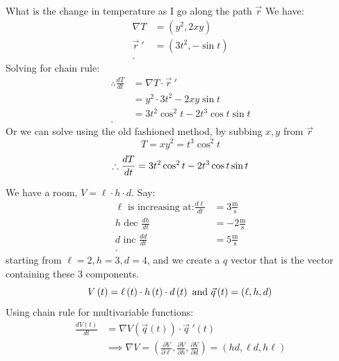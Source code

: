 \begin{itemize}
\begin{example}
\begin{equation}
		\end{equation}
		What is the change in temperature as I go along the path $\vec{r}$ We have:
		\begin{align*}
			\nabla T &= \left( y^2 , 2xy\right) \\
			\vec{r}~' &= \left( 3t^2, -\sin t \right)  \\
		.\end{align*}
		Solving for chain rule:
		\begin{align*}
			\therefore \frac{dT}{dt}&= \nabla T \cdot  \vec{r}~' \\
			&= y^2\cdot 3t^2-2xy\sin t \\
			&= 3t^2\cos^2 t - 2t^3\cos t \sin t \\
		.\end{align*}
		Or we can solve using the old fashioned method, by subbing $x,y$ from $\vec{r}$
		\begin{equation}
			T = xy^2 = t^3 \cos^2 t
		\end{equation}
		\begin{equation}
			\therefore \frac{dT}{dt} = 3t^2\cos^2t - 2t^3\cos t \sin t \\
		\end{equation}
	\end{example}
	\begin{example}
		We have a room, $V = \ell\cdot h\cdot d $. Say:
		\begin{align*}
			\ell \text{ is increasing at:} \frac{d\ell}{dt} &=  3 \frac{\text{m}}{\text{s}} \\
			h \text{ dec } \frac{dh}{dt}&= -2 \frac{\text{m}}{\text{s}} \\
			d \text{ inc } \frac{dd}{dt} &= 5 \frac{\text{m}}{\text{s}} \\
		.\end{align*}
		starting from $ \ell = 2, h = 3, d = 4$, and we create a $q$ vector that is the vector containing these 3 components.
		\begin{equation}
			V\left( t \right) = \ell\left( t \right)  \cdot  h\left( t  \right) \cdot d\left( t \right) \text{ and } \vec{q}\left( t \right) = \left( \ell, h, d \right)  \\
		\end{equation}
		Using chain rule for multivariable functions:
		\begin{align*}
			\frac{dV\left( t \right) }{dt}&= \nabla V\left( \vec{q}\left( t \right)  \right) \cdot  \vec{q}~'\left( t \right)\\
										  &\implies \nabla V = \left( \frac{\partial V}{\partial \ell} , \frac{\partial V}{\partial h} , \frac{\partial V}{\partial d}  \right)  = \left(hd, \ell d , h \ell \right) \\

\end{align*}
\end{example}
\end{itemize}
